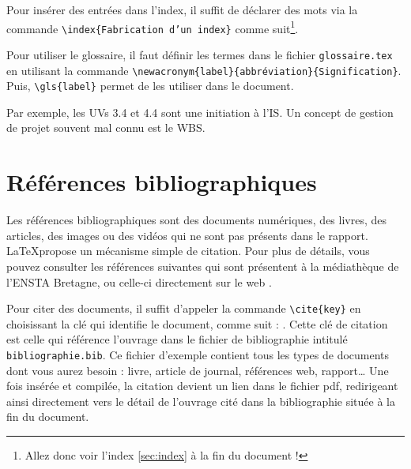 Pour insérer des entrées dans l'index, il suffit de déclarer des mots via la commande \texttt{\textbackslash index\{Fabrication d'un index\}} comme suit\footnote{Allez donc voir l'index \ref{sec:index} à la fin du document  !}. 

Pour utiliser le glossaire, il faut définir les termes dans le fichier \texttt{glossaire.tex} en utilisant la commande \texttt{\textbackslash newacronym\{label\}\{abbréviation\}\{Signification\}}. 
Puis,  \texttt{\textbackslash gls\{label\}} permet de les utiliser dans le document. 


Par exemple, les UVs 3.4 et 4.4 sont une initiation à l'\gls{IS}. 
Un concept de gestion de projet souvent mal connu est le \gls{WBS}.


\section{Références bibliographiques}

Les références bibliographiques sont des documents numériques, des livres, des articles, des images ou des vidéos qui ne sont pas présents dans le rapport. 
\LaTeX propose un mécanisme simple de citation.
Pour plus de détails, vous pouvez consulter les références suivantes \cite{maguis2010redigez,desgraupes2003latex,bitouze2010latex} qui sont présentent à la médiathèque de l'ENSTA Bretagne, ou celle-ci directement sur le web \cite{openclassroomLaTeX}.  

Pour citer des documents, il suffit d'appeler la commande \texttt{\textbackslash cite\{key\}} en choisissant la clé qui identifie le document, comme suit : \cite{lamport1985i1}. 
Cette clé de citation est celle qui référence l'ouvrage dans le fichier de bibliographie intitulé   \texttt{bibliographie.bib}.
Ce fichier d'exemple contient tous les types de documents dont vous aurez besoin : livre, article de journal, références web,  rapport\dots 
Une fois insérée et compilée, la citation devient un lien dans le fichier pdf, redirigeant ainsi directement vers le détail de l'ouvrage cité dans la bibliographie située à la fin du document.
 
